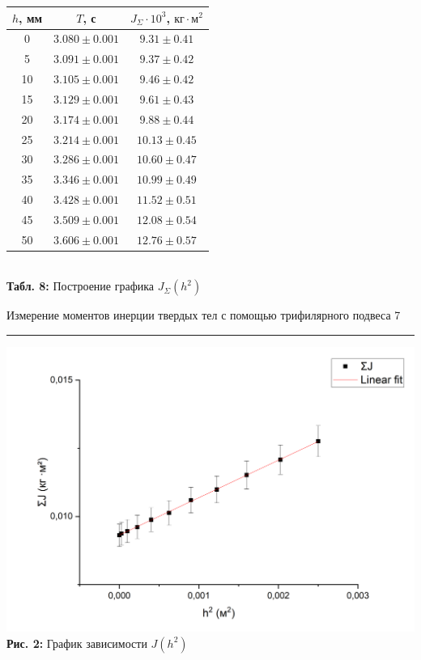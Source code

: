 \documentclass[12pt,a4paper]{scrartcl}
\begin{document}
	\begin{center}
		\begin{tabular}{|c|c|c|}
			\hline
			$h$, мм & $T$, с & $J_\Sigma \cdot 10^3$, $\text{кг}\cdot\text{м}^2$
			\\\hline
			0  & $3.080 \pm 0.001$ & $9.31 \pm 0.41$
			\\\hline
			5  & $3.091 \pm 0.001$ & $9.37 \pm 0.42$
			\\\hline
			10 & $3.105 \pm 0.001$ & $9.46 \pm 0.42$
			\\\hline
			15 & $3.129 \pm 0.001$ & $9.61 \pm 0.43$
			\\\hline
			20 & $3.174 \pm 0.001$ & $9.88 \pm 0.44$
			\\\hline
			25 & $3.214 \pm 0.001$ & $10.13 \pm 0.45$
			\\\hline
			30 & $3.286 \pm 0.001$ & $10.60 \pm 0.47$
			\\\hline
			35 & $3.346 \pm 0.001$ & $10.99 \pm 0.49$
			\\\hline
			40 & $3.428 \pm 0.001$ & $11.52 \pm 0.51$
			\\\hline
			45 & $3.509 \pm 0.001$ & $12.08 \pm 0.54$
			\\\hline
			50 & $3.606 \pm 0.001$ & $12.76 \pm 0.57$
			\\\hline
		\end{tabular}
		\\\textbf{Табл. 8: } Построение графика $J_{\Sigma}(h^2)$
	\end{center}
	
	\newpage
	
	
	\begin{flushleft}
		\footnotesize{Измерение моментов инерции твердых тел с помощью трифилярного подвеса} \hspace{\fill} \footnotesize{7}
		\\[-0.3cm]\noindent\rule{\textwidth}{0.3pt}
	\end{flushleft}
	
	\begin{center}
		\includegraphics[scale=0.5]{PIC_2.png}
		\\\textbf{Рис. 2: } График зависимости $J(h^2)$
	\end{center}
\end{document}
